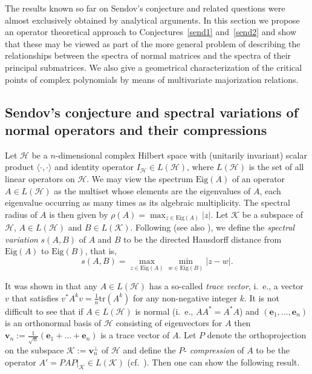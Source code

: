 \documentclass[10pt,twoside,a4paper,reqno]{amsart}
\theoremstyle{plain}
\theoremstyle{definition}
\begin{document}
{The results known so far on Sendov's conjecture and related questions were 
almost exclusively 
obtained by analytical arguments. In this section we propose an operator 
theoretical 
approach to Conjectures~\ref{send1} and~\ref{send2} and show that these may 
be viewed as part of the more general problem of describing the 
relationships between the spectra of normal matrices and the spectra of their 
principal submatrices. We also give a geometrical characterization of the 
critical points of complex polynomials by means of multivariate majorization 
relations.

\subsection{Sendov's conjecture and spectral variations of normal operators 
and their compressions}

Let $\mathcal{H}$ be a $n$-dimensional complex Hilbert space with (unitarily 
invariant) scalar 
product $\langle\cdot,\!\cdot\rangle$ and identity operator 
$I_{\mathcal{H}}\in L(\mathcal{H})$, where $L(\mathcal{H})$ is the
set of all linear operators on $\mathcal{H}$. We may view the spectrum
$\text{Eig}(A)$ of an operator $A\in L(\mathcal{H})$ as the multiset whose 
elements are the eigenvalues of $A$, each eigenvalue occurring as many times 
as its algebraic multiplicity. The spectral radius of $A$ is then given 
by $\rho(A)=\max_{z\in \text{Eig}(A)}|z|$. Let $\mathcal{K}$ be a 
subspace of $\mathcal{H}$, $A\in L(\mathcal{H})$ and $B\in L(\mathcal{K})$. 
Following \cite{He} (see also \cite{Sc}), we define the {\em spectral 
variation} $s(A,B)$ of $A$ and $B$ to be the directed Hausdorff distance from 
$\text{Eig}(A)$ to $\text{Eig}(B)$, that is,
$$s(A,B)=\max_{z\in \text{Eig}(A)}\min_{w\in \text{Eig}(B)}|z-w|.$$

It was shown in \cite[Theorem 1.11]{P} that any $A\in L(\mathcal{H})$ has a 
so-called {\em trace vector}, i.~e., a vector $v$ that satisfies 
$v^{*}A^{k}v=\frac{1}{n}\text{tr}(A^k)$ for any non-negative integer $k$. 
It is not difficult to see that if $A\in L(\mathcal{H})$ is normal (i.~e., 
$AA^{*}=A^{*}A$) and 
$(\mathbf{e}_1,\ldots,\mathbf{e}_n)$ is an orthonormal basis of 
$\mathcal{H}$ consisting of 
eigenvectors for $A$ then $\mathbf{v}_{n}:=\frac{1}{\sqrt{n}}(\mathbf{e}_1+
\ldots+\mathbf{e}_n)$ is a 
trace vector of $A$. Let $P$ denote the orthoprojection on the subspace 
$\mathcal{K}:=\mathbf{v}_{n}^{\perp}$ of $\mathcal{H}$ and define the $P$-{\em 
compression} of $A$ to be 
the operator $A'=PAP|_{\mathcal{K}}\in L(\mathcal{K})$ (cf.~\cite{D}). Then 
one can show the following result.

}
\end{document}
